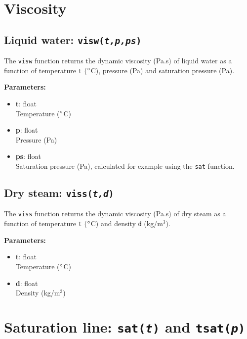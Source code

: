 \section{Viscosity}

\begin{snugshade}
\subsection{Liquid water: \texttt{visw(\emph{t,p,ps})}}
\end{snugshade}
\label{sec:t2thermo:visw}

The \texttt{visw} function returns the dynamic viscosity (Pa.s) of liquid water as a function of temperature \texttt{t} ($\degree$C), pressure (Pa) and saturation pressure (Pa).

\textbf{Parameters:}
\begin{itemize}
\item \textbf{t}: float\\
  Temperature ($\degree$C)
\item \textbf{p}: float\\
  Pressure (Pa)
\item \textbf{ps}: float\\
  Saturation pressure (Pa), calculated for example using the \texttt{sat} function.
\end{itemize}

\begin{snugshade}
\subsection{Dry steam: \texttt{viss(\emph{t,d})}}
\end{snugshade}
\label{sec:t2thermo:viss}

The \texttt{viss} function returns the dynamic viscosity (Pa.s) of dry steam as a function of temperature \texttt{t} ($\degree$C) and density \texttt{d} (kg/m$^3$).

\textbf{Parameters:}
\begin{itemize}
\item \textbf{t}: float\\
  Temperature ($\degree$C)
\item \textbf{d}: float\\
  Density (kg/m$^3$)
\end{itemize}

\section{Saturation line: \texttt{sat(\emph{t})} and \texttt{tsat(\emph{p})}}

